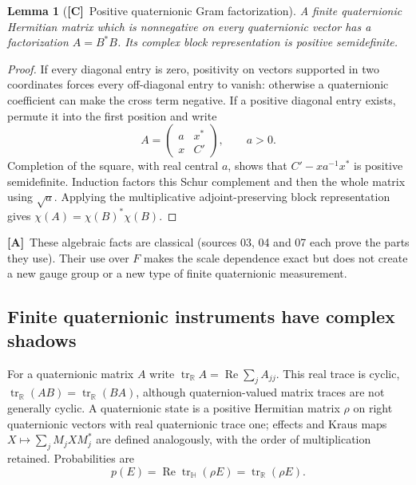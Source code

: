 \documentclass[11pt,oneside]{article}
\numberwithin{equation}{section}
\theoremstyle{plain}
\newtheorem{lemma}[lemma]{Lemma}
\theoremstyle{definition}
\theoremstyle{remark}
\newcommand{\R}{\mathbb R}
\newcommand{\HH}{\mathbb H}
\DeclareMathOperator{\tr}{tr}
\DeclareMathOperator{\Rea}{Re}
\newcommand{\TC}{\textcolor{TierC}{\textsf{\bfseries[C]}}}
\newcommand{\TA}{\textcolor{TierA}{\textsf{\bfseries[A]}}}
\begin{document}
\begin{lemma}[\TC\ Positive quaternionic Gram factorization]\label{qgs:hol:lem:qgram}
A finite quaternionic Hermitian matrix which is nonnegative on every quaternionic vector has a factorization $A=B^*B$. Its complex block representation is positive semidefinite.
\end{lemma}
\begin{proof}
If every diagonal entry is zero, positivity on vectors supported in two coordinates forces every off-diagonal entry to vanish: otherwise a quaternionic coefficient can make the cross term negative. If a positive diagonal entry exists, permute it into the first position and write
\[
 A=\begin{pmatrix}a&x^*\\x&C'\end{pmatrix},\qquad a>0.
\]
Completion of the square, with real central $a$, shows that $C'-xa^{-1}x^*$ is positive semidefinite. Induction factors this Schur complement and then the whole matrix using $\sqrt a$. Applying the multiplicative adjoint-preserving block representation gives $\chi(A)=\chi(B)^*\chi(B)$.
\end{proof}

\TA\ These algebraic facts are classical (sources 03, 04 and 07 each prove the parts they use). Their use over $F$ makes the scale dependence exact but does not create a new gauge group or a new type of finite quaternionic measurement.

\subsection{Finite quaternionic instruments have complex shadows}
For a quaternionic matrix $A$ write $\tr_\R A=\Rea\sum_jA_{jj}$. This real trace is cyclic, $\tr_\R(AB)=\tr_\R(BA)$, although quaternion-valued matrix traces are not generally cyclic. A quaternionic state is a positive Hermitian matrix $\rho$ on right quaternionic vectors with real quaternionic trace one; effects and Kraus maps $X\mapsto\sum_jM_jXM_j^*$ are defined analogously, with the order of multiplication retained. Probabilities are
\begin{equation}\label{qgs:eq:quatborn}
 p(E)=\Rea\tr_{\HH}(\rho E)=\tr_\R(\rho E).
\end{equation}
\end{document}

